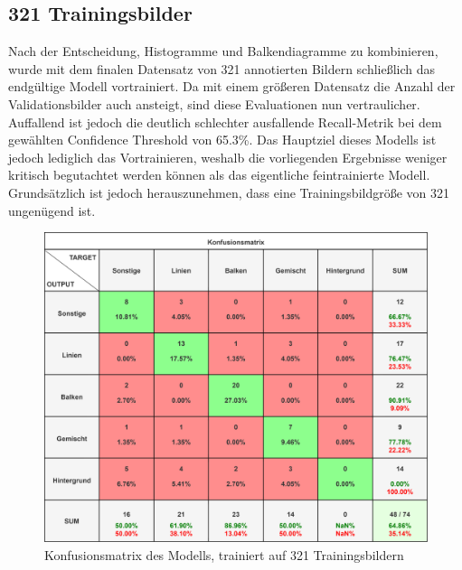 \subsection*{321 Trainingsbilder}
Nach der Entscheidung, Histogramme und Balkendiagramme zu kombinieren, wurde mit dem finalen Datensatz von 321 annotierten Bildern schließlich das endgültige Modell vortrainiert. Da mit einem größeren Datensatz die Anzahl der Validationsbilder auch ansteigt, sind diese Evaluationen nun vertraulicher. Auffallend ist jedoch die deutlich schlechter ausfallende Recall-Metrik bei dem gewählten Confidence Threshold von 65.3\%. Das Hauptziel dieses Modells ist jedoch lediglich das Vortrainieren, weshalb die vorliegenden Ergebnisse weniger kritisch begutachtet werden können als das eigentliche feintrainierte Modell. Grundsätzlich ist jedoch herauszunehmen, dass eine Trainingsbildgröße von 321 ungenügend ist.

\begin{figure}[H]
    \centering
    \captionsetup{width=1\linewidth}
    \includegraphics[width=1\textwidth]{Experimente/img/detect/3_val@0.653_nohisto/konfusionsmatrix.png}
    \caption{ Konfusionsmatrix des Modells, trainiert auf 321 Trainingsbildern}
    \label{fig:extraction_output}
\end{figure}

